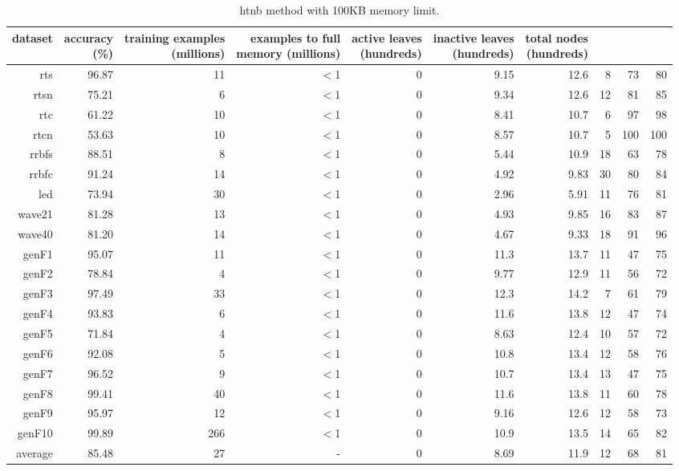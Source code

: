 \clearpage
\begin{table}
\caption{{\sc htnb} method with 100KB memory limit.}
\label{tab:htnb-100k}
\centering
\begin{tabular}{|r|r|r|r|r|r|r|r|r|r|}
\hline
dataset	&
\rotatebox{90}{\parbox{9em}{accuracy\\(\%)}} &
\rotatebox{90}{\parbox{9em}{training examples\\(millions)}} &
\rotatebox{90}{\parbox{9em}{examples to full\\memory (millions)}} &
\rotatebox{90}{\parbox{9em}{active leaves\\(hundreds)}} &
\rotatebox{90}{\parbox{9em}{inactive leaves\\(hundreds)}} &
\rotatebox{90}{\parbox{9em}{total nodes\\(hundreds)}} &
\rotatebox{90}{\parbox{9em}{tree depth}}	&
\rotatebox{90}{\parbox{9em}{training speed (\%)}} &
\rotatebox{90}{\parbox{9em}{prediction speed (\%)}} \\
\hline
{\sc rts} & 96.87 & 11 & $<$1 & 0 & 9.15 & 12.6 & 8 & 73 & 80 \\
{\sc rtsn} & 75.21 & 6 & $<$1 & 0 & 9.34 & 12.6 & 12 & 81 & 85 \\
{\sc rtc} & 61.22 & 10 & $<$1 & 0 & 8.41 & 10.7 & 6 & 97 & 98 \\
{\sc rtcn} & 53.63 & 10 & $<$1 & 0 & 8.57 & 10.7 & 5 & 100 & 100 \\
{\sc rrbfs} & 88.51 & 8 & $<$1 & 0 & 5.44 & 10.9 & 18 & 63 & 78 \\
{\sc rrbfc} & 91.24 & 14 & $<$1 & 0 & 4.92 & 9.83 & 30 & 80 & 84 \\
{\sc led} & 73.94 & 30 & $<$1 & 0 & 2.96 & 5.91 & 11 & 76 & 81 \\
{\sc wave21} & 81.28 & 13 & $<$1 & 0 & 4.93 & 9.85 & 16 & 83 & 87 \\
{\sc wave40} & 81.20 & 14 & $<$1 & 0 & 4.67 & 9.33 & 18 & 91 & 96 \\
{\sc genF1} & 95.07 & 11 & $<$1 & 0 & 11.3 & 13.7 & 11 & 47 & 75 \\
{\sc genF2} & 78.84 & 4 & $<$1 & 0 & 9.77 & 12.9 & 11 & 56 & 72 \\
{\sc genF3} & 97.49 & 33 & $<$1 & 0 & 12.3 & 14.2 & 7 & 61 & 79 \\
{\sc genF4} & 93.83 & 6 & $<$1 & 0 & 11.6 & 13.8 & 12 & 47 & 74 \\
{\sc genF5} & 71.84 & 4 & $<$1 & 0 & 8.63 & 12.4 & 10 & 57 & 72 \\
{\sc genF6} & 92.08 & 5 & $<$1 & 0 & 10.8 & 13.4 & 12 & 58 & 76 \\
{\sc genF7} & 96.52 & 9 & $<$1 & 0 & 10.7 & 13.4 & 13 & 47 & 75 \\
{\sc genF8} & 99.41 & 40 & $<$1 & 0 & 11.6 & 13.8 & 11 & 60 & 78 \\
{\sc genF9} & 95.97 & 12 & $<$1 & 0 & 9.16 & 12.6 & 12 & 58 & 73 \\
{\sc genF10} & 99.89 & 266 & $<$1 & 0 & 10.9 & 13.5 & 14 & 65 & 82 \\
\hline
average & 85.48 & 27 &  -  & 0 & 8.69 & 11.9 & 12 & 68 & 81 \\
\hline
\end{tabular}
\end{table}
